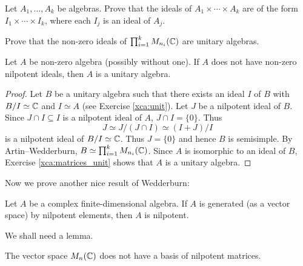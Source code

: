 \begin{exercise}
Let $A_1,\dots,A_k$ be algebras. 
Prove that the ideals of $A_1\times\cdots\times A_k$ 
are of the form $I_1\times\cdots\times I_k$, where
each $I_j$ is an ideal of $A_j$.  
\end{exercise}

\begin{exercise}
\label{xca:matrices_unit}
    Prove that the non-zero ideals of 
    $\prod_{i=1}^k M_{n_i}(\mathbb{C})$ are unitary algebras.  
\end{exercise}

\begin{proposition}
    Let $A$ be non-zero algebra (possibly without one). If $A$ 
    does not have non-zero nilpotent 
    ideals, then $A$ is a unitary algebra. 
\end{proposition}

\begin{proof}
    Let $B$ be a unitary algebra such that there exists
    an ideal $I$ of $B$ with $B/I\simeq\mathbb{C}$ and $I\simeq A$ 
    (see Exercise \ref{xca:unit}). Let $J$ be 
    a nilpotent ideal of $B$. Since $J\cap I\subseteq I$ is a nilpotent
    ideal of $A$, 
    $J\cap I=\{0\}$. Thus 
    \[
    J\simeq J/(J\cap I)\simeq (I+J)/I
    \]
    is a nilpotent ideal of $B/I\simeq\mathbb{C}$. Thus $J=\{0\}$ 
    and hence $B$ is semisimple. By Artin--Wedderburn, 
    $B\simeq\prod_{i=1}^k M_{n_i}(\mathbb{C})$. Since $A$ is isomorphic to an ideal of 
    $B$, Exercise \ref{xca:matrices_unit} shows
    that $A$ is a unitary algebra. 
\end{proof}

Now we prove another nice result of Wedderburn:

\begin{theorem}[Wedderburn]
\label{thm:Wedderburn_nilpotent}
    Let $A$ be a complex finite-dimensional 
    algebra. If $A$ is generated (as a vector space) 
    by nilpotent elements, then $A$ is nilpotent. 
\end{theorem}

We shall need a lemma.

\begin{lemma}
    The vector space $M_n(\mathbb{C})$ does not have a basis of nilpotent matrices. 
\end{lemma}

